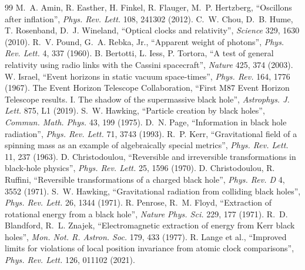 \documentclass[11pt,a4paper]{article}
\theoremstyle{definition}
\theoremstyle{remark}
\begin{document}
\begin{thebibliography}{99}
 M.~A. Amin, R. Easther, H. Finkel, R. Flauger, M.~P. Hertzberg, ``Oscillons after inflation'', \emph{Phys. Rev.
Lett.} 108, 241302 (2012).
 C.~W. Chou, D.~B. Hume, T. Rosenband, D.~J. Wineland, ``Optical clocks and relativity'', \emph{Science} 329, 1630 (2010).
 R.~V. Pound, G.~A. Rebka, Jr., ``Apparent weight of photons'', \emph{Phys. Rev. Lett.} 4, 337 (1960).
 B. Bertotti, L. Iess, P. Tortora, ``A test of general relativity using radio links with the Cassini spacecraft'',
\emph{Nature} 425, 374 (2003).
 W. Israel, ``Event horizons in static vacuum space-times'', \emph{Phys. Rev.} 164, 1776 (1967).
 The Event Horizon Telescope Collaboration, ``First M87 Event Horizon Telescope results. I. The shadow of the supermassive
black hole'', \emph{Astrophys. J. Lett.} 875, L1 (2019).
 S.~W. Hawking, ``Particle creation by black holes'', \emph{Commun. Math. Phys.} 43, 199 (1975).
 D.~N. Page, ``Information in black hole radiation'', \emph{Phys. Rev. Lett.} 71, 3743 (1993).
 R.~P. Kerr, ``Gravitational field of a spinning mass as an example of algebraically special metrics'', \emph{Phys. Rev.
Lett.} 11, 237 (1963).
 D. Christodoulou, ``Reversible and irreversible transformations in black-hole physics'', \emph{Phys. Rev. Lett.}
25, 1596 (1970).
 D. Christodoulou, R. Ruffini, ``Reversible transformations of a charged black hole'', \emph{Phys. Rev. D} 4, 3552 (1971).
 S.~W. Hawking, ``Gravitational radiation from colliding black holes'', \emph{Phys. Rev. Lett.} 26, 1344 (1971).
 R. Penrose, R.~M. Floyd, ``Extraction of rotational energy from a black hole'', \emph{Nature Phys. Sci.} 229, 177
(1971).
 R.~D. Blandford, R.~L. Znajek, ``Electromagnetic extraction of energy from Kerr black holes'', \emph{Mon. Not. R. Astron. Soc.}
179, 433 (1977).
 R. Lange et al., ``Improved limits for violations of local position invariance from atomic clock comparisons'',
\emph{Phys. Rev. Lett.} 126, 011102 (2021).
\end{thebibliography}
\end{document}
